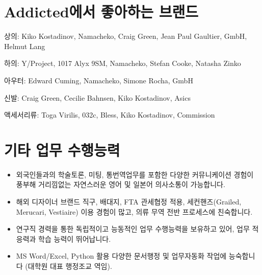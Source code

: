 \section*{Addicted에서 좋아하는 브랜드}
\noindent
상의: Kiko Kostadinov, Namacheko, Craig Green, Jean Paul Gaultier, GmbH, Helmut Lang

\noindent
하의: Y/Project, 1017 Alyx 9SM, Namacheko, Stefan Cooke, Natasha Zinko

\noindent
아우터: Edward Cuming, Namacheko, Simone Rocha, GmbH

\noindent
신발: Craig Green, Cecilie Bahnsen, Kiko Kostadinov, Asics

\noindent
액세서리류: Toga Virilis, 032c, Bless, Kiko Kostadinov, Commission


\section*{기타 업무 수행능력}
\begin{itemize}
    \item 외국인들과의 학술토론, 미팅, 통번역업무를 포함한 다양한 커뮤니케이션 경험이 풍부해 거리낌없는 자연스러운 영어 및 일본어 의사소통이 가능합니다.
    \item 해외 디자이너 브랜드 직구, 배대지, FTA 관세협정 적용, 세컨핸즈(Grailed, Merucari, Vestiaire) 이용 경험이 많고, 의류 무역 전반 프로세스에 친숙합니다.
    
    \item 연구직 경력을 통한 독립적이고 능동적인 업무 수행능력을 보유하고 있어, 업무 적응력과 학습 능력이 뛰어납니다.
    \item MS Word/Excel, Python 활용 다양한 문서행정 및 업무자동화 작업에 능숙합니다 (대학원 대표 행정조교 역임).
\end{itemize}